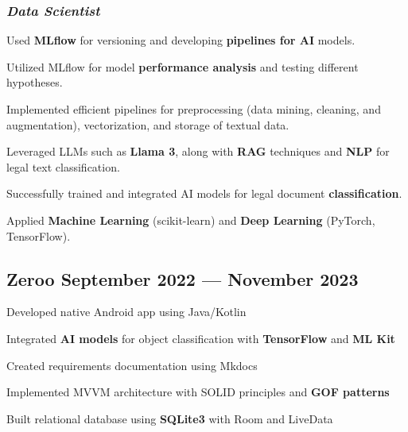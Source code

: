 \documentclass[a4paper,12pt]{article}
\begin{document}
\subsubsection*{\normalsize \textit{Data Scientist}}
\vspace{-1.3em}
\vspace{-0.5em}
\begin{zitemize}

  \item Used \textbf{MLflow} for versioning and developing \textbf{pipelines for AI} models.  
  \item Utilized MLflow for model \textbf{performance analysis} and testing different hypotheses.  
  \item Implemented efficient pipelines for preprocessing (data mining, cleaning, and augmentation), vectorization, and storage of textual data.  
  \item Leveraged LLMs such as \textbf{Llama 3}, along with \textbf{RAG} techniques and \textbf{NLP} for legal text classification.  
  \item Successfully trained and integrated AI models for legal document \textbf{classification}.  
  \item Applied \textbf{Machine Learning} (scikit-learn) and \textbf{Deep Learning} (PyTorch, TensorFlow).  
\end{zitemize}

\vspace{1.5em}
\vspace*{7pt}
\vspace{1.5em}

\subsection*{\large Zeroo \hfill September 2022 --- November 2023}

\vspace{-0.5em}
\begin{zitemize}
    \item Developed native Android app using Java/Kotlin
    \item Integrated \textbf{AI models} for object classification with \textbf{TensorFlow} and \textbf{ML Kit}
    \item Created requirements documentation using Mkdocs
    \item Implemented MVVM architecture with SOLID principles and \textbf{GOF patterns}
    \item Built relational database using \textbf{SQLite3} with Room and LiveData
\end{zitemize}
\end{document}
